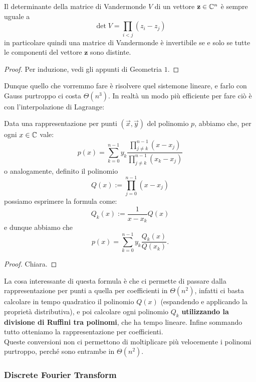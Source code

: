 \documentclass[11pt]{scrartcl}
\newcommand{\bigtheta}[1]{\Theta\!\left(#1\right)}
\begin{document}
	\begin{lemma}[Vandermonde]
		Il determinante della matrice di Vandermonde $V$ di un vettore $\mathbf{z}\in\mathbb C^n$ è sempre uguale a 
		$$\det V=\prod_{i< j}\left(z_i-z_j\right)$$ 
		in particolare quindi una matrice di Vandermonde è invertibile se e solo se tutte le componenti del vettore $\mathbf{z}$ sono distinte.
	\end{lemma}
	\begin{proof}
		Per induzione, vedi gli appunti di Geometria $1$.
	\end{proof}
	Dunque quello che vorremmo fare è risolvere quel sistemone lineare, e farlo con Gauss purtroppo ci costa $\bigtheta{n^3}$. In realtà un modo più efficiente per fare ciò è con l'interpolazione di Lagrange:
	\begin{lemma}
		Data una rappresentazione per punti $\left(\vec{x},\vec{y}\right)$ del polinomio $p$, abbiamo che, per ogni $x\in\mathbb C$ vale:
		$$p(x)=\sum_{k=0}^{n-1}y_k\frac{\prod_{j\ne k}^{n-1}\left(x-x_j\right)}{\prod_{j\ne k}^{n-1} \left(x_k-x_j\right)}$$
		o analogamente, definito il polinomio
		$$Q(x):=\prod_{j=0}^{n-1}\left(x-x_j\right)$$
		possiamo esprimere la formula come:
		$$Q_k(x):=\frac{1}{x-x_k}Q(x)$$
		e dunque abbiamo che 
		$$p(x)=\sum_{k=0}^{n-1}y_k\frac{Q_k(x)}{Q(x_k)}.$$
	\end{lemma}
	\begin{proof}
		Chiara.
	\end{proof}
	La cosa interessante di questa formula è che ci permette di passare dalla rappresentazione per punti a quella per coefficienti in $\bigtheta{n^2}$, infatti ci basta calcolare in tempo quadratico il polinomio $Q(x)$ (espandendo e applicando la proprietà distributiva), e poi calcolare ogni polinomio $Q_k$ \textbf{utilizzando la divisione di Ruffini tra polinomi}, che ha tempo lineare. Infine sommando tutto otteniamo la rappresentazione per coefficienti. \\
	Queste conversioni non ci permettono di moltiplicare più velocemente i polinomi purtroppo, perché sono entrambe in $\bigtheta{n^2}$.
	
	\subsubsection{Discrete Fourier Transform}
	
\end{document}
